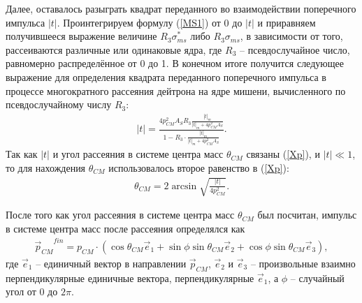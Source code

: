 \documentclass[a4paper,12pt]{article}
\begin{document}
\begin{large}
 Далее, оставалось разыграть квадрат переданного во взаимодействии поперечного импульса $|t|$.
 Проинтегрируем формулу (\ref{MS1}) от 0 до $|t|$ и приравняем получившееся выражение величине $R_3\sigma_{ms}^*$ либо $R_3\sigma_{ms}$, в зависимости от того, рассеиваются различные или одинаковые ядра, где $R_3$ -- псевдослучайное число, равномерно распределённое от 0 до 1.
 В конечном итоге получится следующее выражение для определения квадрата переданного поперечного импульса в процессе многократного рассеяния дейтрона на ядре мишени, вычисленного по псевдослучайному числу $R_3$:
\begin{equation}
\label{MStrand}
\begin{aligned} 
|t| = \frac{ 4p_{CM}^2 A_S R_3 \frac{|t|_m}{|t|_m + 4p_{CM}^2 A_S} }{ 1 - R_3 \cdot \frac{|t|_m}{|t|_m + 4p_{CM}^2 A_S} }.
\end{aligned}
\end{equation}
  Так как $|t|$  и угол рассеяния в системе центра масс $\theta_{CM}$ связаны (\ref{Xp}), и $|t| \ll 1$, то для нахождения $\theta_{CM}$ использовалось второе равенство в (\ref{Xp}):
\begin{equation}
\label{MSThetacm}
\begin{aligned} 
\theta_{CM} = 2\arcsin{\sqrt{ \frac{|t|}{4p_{CM}^2}} }.
\end{aligned}
\end{equation}

После того как угол рассеяния в системе центра масс $\theta_{CM}$ был посчитан, импульс в системе центра масс после рассеяния определялся как
\begin{equation}
\label{MScmMomentumAfter}
\begin{aligned} 
{\vec{p}_{CM}}^{fin} = p_{CM}\cdot\left(\cos{\theta_{CM}}\vec{e}_1 + \sin{\phi}\sin{\theta_{CM}}  \vec{e}_2 +  \cos{\phi}\sin{\theta_{CM}}\vec{e}_3\right),
\end{aligned}
\end{equation}
где $\vec{e}_1$ -- единичный вектор в направлении $\vec{p}_{CM}$, $\vec{e}_2$ и $\vec{e}_3$ -- произвольные взаимно перпендикулярные единичные вектора, перпендикулярные $\vec{e}_1$, а $\phi$ -- случайный угол от $0$ до $2\pi$.


\end{large}
\end{document}
